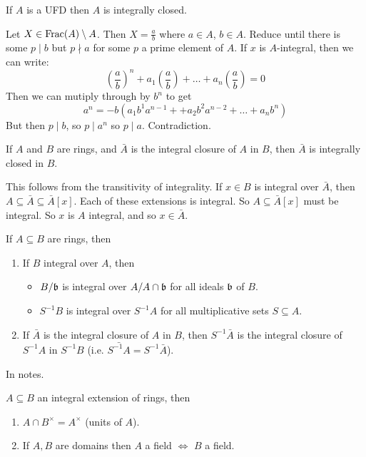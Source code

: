\documentclass{article}
\begin{document}
\begin{fancyprop}{}
    If $A$ is a UFD then $A$ is integrally closed.
\end{fancyprop}
\proof Let $X \in \operatorname{Frac} (A) \setminus A$. Then $X = \frac{a}{b}$ where $a \in A$, $b \in A$. Reduce until there is some $p \mid b$ but $p \nmid a$ for some $p$ a prime element of $A$. If $x$ is $A$-integral, then we can write: \[ \left(\frac{a}{b}\right)^{n} + a_{1} \left(\frac{a}{b}\right) + \dots + a_{n} \left(\frac{a}{b}\right) = 0\] Then we can mutiply through by $b^{n}$ to get \[ a^{n} = -b(a_{1}b^{1}a^{n-1} + + a_{2}b^{2}a^{n-2} + \dots + a_{n}b^{n}) \] But then $p \mid b$, so $p \mid a^{n}$ so $p \mid a$. Contradiction. \endproof
\begin{fancylem}{}
    If $A$ and $B$ are rings, and $\bar A$ is the integral closure of $A$ in $B$, then $\bar A$ is integrally closed in $B$.
\end{fancylem}
\proof This follows from the transitivity of integrality. If $x \in B$ is integral over $\bar A$, then $A \subseteq \bar A \subseteq \bar A[x]$. Each of these extensions is integral. So $A \subseteq \bar A[x]$ must be integral. So $x$ is $A$ integral, and so $x \in \bar A$.
\begin{fancyprop}{}
    If $A \subseteq B$ are rings, then \begin{enumerate}
        \item If $B$ integral over $A$, then \begin{itemize}
            \item $B/ \mathfrak{b}$ is integral over $A / A \cap \mathfrak{b}$ for all ideals $\mathfrak{b}$ of $B$.
            \item $S^{-1}B$ is integral over $S^{-1}A$ for all multiplicative sets $S \subseteq A$.
        \end{itemize}
        \item If $\bar A$ is the integral closure of $A$ in $B$, then $S^{-1} \bar A$ is the integral closure of $S^{-1}A$ in $S^{-1}B$ (i.e. $ \bar{S^{-1}A} = S^{-1} \bar A$).
        
    \end{enumerate}
\end{fancyprop}
\proof In notes.
\begin{fancylem}{}
    $A \subseteq B$ an integral extension of rings, then \begin{enumerate}
        \item $A \cap B^{\times} = A^{\times}$ (units of $A$).
        \item If $A,B$ are domains then $A$ a field $\Leftrightarrow$ $B$ a field.
    \end{enumerate}
\end{fancylem}
\end{document}

